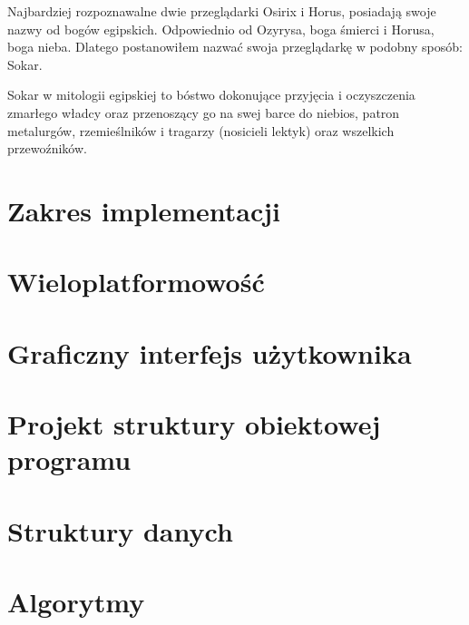 
\par
Najbardziej rozpoznawalne dwie przeglądarki Osirix i Horus, posiadają swoje nazwy od bogów egipskich.
Odpowiednio od Ozyrysa, boga śmierci i Horusa, boga nieba.
Dlatego postanowiłem nazwać swoja przeglądarkę w podobny sposób: Sokar.
\par
Sokar w mitologii egipskiej to bóstwo dokonujące przyjęcia i oczyszczenia zmarłego władcy oraz przenoszący go na swej barce do niebios, patron metalurgów, rzemieślników i tragarzy (nosicieli lektyk) oraz wszelkich przewoźników.

\section{Zakres implementacji}


\section{Wieloplatformowość}


\section{Graficzny interfejs użytkownika}
\sokarclassExplanations


\section{Projekt struktury obiektowej programu}


\section{Struktury danych}


\section{Algorytmy}

